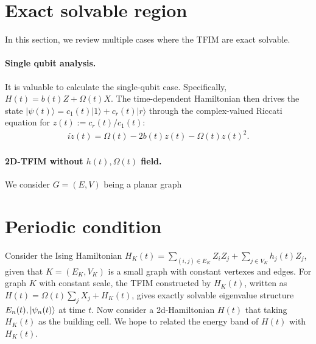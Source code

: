 \section{Exact solvable region}
In this section, we review multiple cases where the TFIM are exact solvable.

\paragraph{Single qubit analysis.} It is valuable to calculate the single-qubit case. Specifically, $H(t)=b(t)Z+\Omega(t) X$. The time-dependent Hamiltonian then drives the state $|\psi(t)\rangle = c_1(t)|1\rangle+c_r(t)|r\rangle$ through the complex-valued Riccati equation for $z(t):= c_r(t)/c_1(t)$:
\begin{align}
    i\dot z(t) = \Omega(t) - 2b(t)z(t) - \Omega(t)z(t)^2.
\end{align}

\paragraph{2D-TFIM without $h(t), \Omega(t)$ field.}

We consider $G = (E,V)$ being a planar graph 

\section{Periodic condition}

Consider the Ising Hamiltonian $H_K(t) = \sum_{(i,j) \in E_K} Z_i Z_j + \sum_{j \in V_K} h_j(t) Z_j$, given that $K = (E_K,V_K)$ is a small graph with constant vertexes and edges. 
For graph $K$ with constant scale, the TFIM constructed by $H_K(t)$, written as $H(t) = \Omega(t)\sum_j X_j + H_K(t)$, gives exactly solvable eigenvalue structure $E_n(t), \ket{\psi_n(t)}$ at time $t$.
Now consider a 2d-Hamiltonian $H(t)$ that taking $H_K(t)$ as the building cell. We hope to related the energy band of $H(t)$ with $H_K(t)$.


